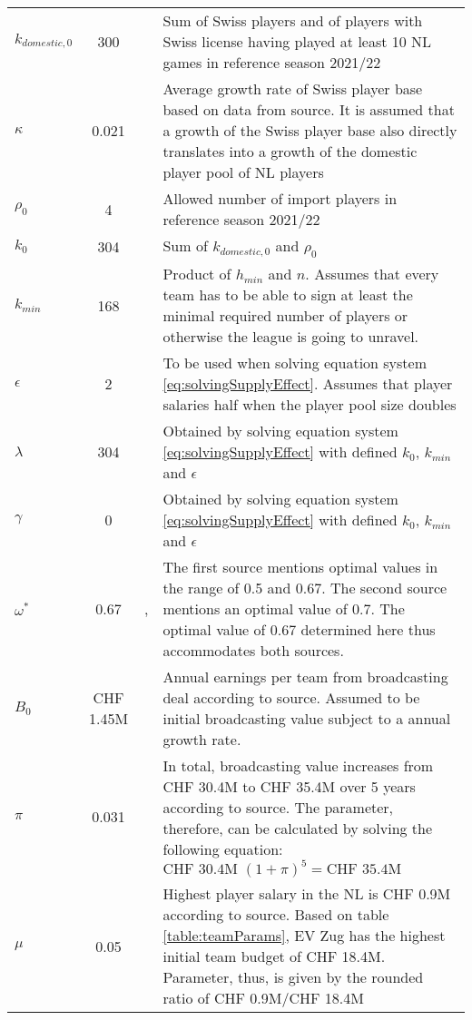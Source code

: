 \begin{longtable}[h!]{lc>{\baselineskip=15pt}p{4cm}>{\baselineskip=15pt}p{6cm}}
    $k_{domestic,0}$  & 300 & \cite{elite_prospects_elite_2022} & Sum of Swiss players and of players with Swiss license having played at least 10 NL games in reference season 2021/22 \\
    $\kappa$  & 0.021 & \cite{iihf_iihf_2022} & Average growth rate of Swiss player base based on data from source. It is assumed that a growth of the Swiss player base also directly translates into a growth of the domestic player pool of NL players \\
    $\rho_0$  & 4 &  & Allowed number of import players in reference season 2021/22 \\
    $k_0$  & 304 &  & Sum of $k_{domestic,0}$ and $\rho_0$ \\
    $k_{min}$  & 168 &  & Product of $h_{min}$ and $n$. Assumes that every team has to be able to sign at least the minimal required number of players or otherwise the league is going to unravel.\\
    $\epsilon$  & 2 &  & To be used when solving equation system \ref{eq:solvingSupplyEffect}. Assumes that player salaries half when the player pool size doubles \\
    $\lambda$  & 304 &  & Obtained by solving equation system \ref{eq:solvingSupplyEffect} with defined $k_0$, $k_{min}$ and $\epsilon$ \\
    $\gamma$  & 0 &  & Obtained by solving equation system \ref{eq:solvingSupplyEffect} with defined $k_0$, $k_{min}$ and $\epsilon$ \\
    $\omega^*$  & 0.67 & \cite{kesenne_optimal_2015}, \cite{rascher_fans_2007} & The first source mentions optimal values in the range of 0.5 and 0.67. The second source mentions an optimal value of 0.7. The optimal value of 0.67 determined here thus accommodates both sources. \\
    $B_0$  & CHF 1.45M & \cite{zaugg_wie_2017} & Annual earnings per team from broadcasting deal according to source. Assumed to be initial broadcasting value subject to a annual growth rate. \\
    $\pi$  & 0.031 & \cite{zaugg_wie_2017} & In total, broadcasting value increases from CHF 30.4M to CHF 35.4M over 5 years according to source. The parameter, therefore, can be calculated by solving the following equation:
    $\textrm{CHF 30.4M }(1+\pi)^5=\textrm{CHF 35.4M}$ \\
    $\mu$  & 0.05 & \cite{allemann_sind_2020} & Highest player salary in the NL is CHF 0.9M according to source. Based on table \ref{table:teamParams}, EV Zug has the highest initial team budget of CHF 18.4M. Parameter, thus, is given by the rounded ratio of CHF 0.9M/CHF 18.4M \\

\end{longtable}
